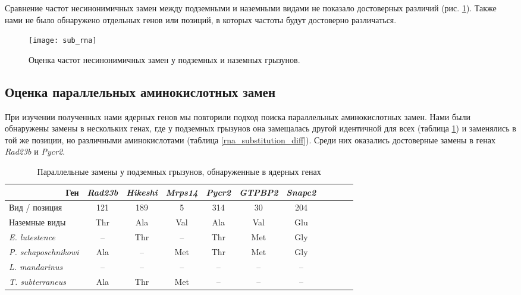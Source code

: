 Сравнение частот несинонимичных замен между подземными и наземными видами не показало достоверных различий (рис. \ref{sub_RNA}). Также нами не было обнаружено отдельных генов  или позиций, в которых частоты будут достоверно различаться. 

\begin{figure}[h!]
	\begin{center}
		\texttt{[image: sub\_rna]}
	\end{center}
	\caption{Оценка частот несинонимичных замен у подземных и наземных грызунов.}\label{sub_RNA}
\end{figure}

\subsection{Оценка параллельных аминокислотных замен}

При изучении полученных нами ядерных генов мы повторили подход поиска параллельных аминокислотных замен. Нами были обнаружены замены в нескольких генах, где у подземных грызунов она замещалась другой идентичной для всех (таблица \ref{rna_substitution_all}) и заменялись в той же позиции, но различными аминокислотами (таблица \ref{rna_substitution_diff}). Среди них оказались достоверные замены в генах \textit{Rad23b} и \textit{Pycr2}. 

\begin{table}[]
	\caption{Параллельные замены у подземных грызунов, обнаруженные в ядерных генах}\label{rna_substitution_all} \vspace{5mm}
	
	\begin{center}
	\begin{tabular}{|l|c|c|c|c|c|c|c|c|c|c}
		\hline
		\multicolumn{1}{|r|}{Ген} & \textit{Rad23b} & \textit{Hikeshi} & \textit{Mrps14} & \textit{Pycr2} & \textit{GTPBP2} & \textit{Snapc2} \\ \hline
		Вид   / позиция & 121 & 189 & 5 & 314 & 30 & 204  \\ \hline
		Наземные виды &  Thr & Ala & Val & Ala & Val & Glu  \\ \hline
		\textit{E. lutestence}  & -- & Thr & -- & Thr  & Met & Gly  \\ \hline
		\textit{P. schaposchnikowi}  & Ala & -- & Met & Thr & Met & Gly  \\ \hline
		\textit{L. mandarinus}  & -- & -- & -- & --  & -- & --  \\ \hline
		\textit{T. subterraneus} & Ala & Thr  & Met & -- & -- & -- \\ \hline
	\end{tabular}
\end{center}
\end{table}


